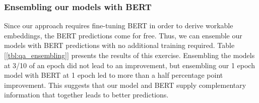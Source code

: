 
\subsubsection{Ensembling our models with BERT}

Since our approach requires fine-tuning BERT in order to derive workable embeddings, the BERT predictions come for free. Thus, we can ensemble our models with BERT predictions with no additional training required. Table [\ref{tbl:qa_ensembling}] presents the results of this exercise. Ensembling the models at 3/10 of an epoch did not lead to an improvement, but ensembling our 1 epoch model with BERT at 1 epoch led to more than a half percentage point improvement. This suggests that our model and BERT supply complementary information that together leads to better predictions.

